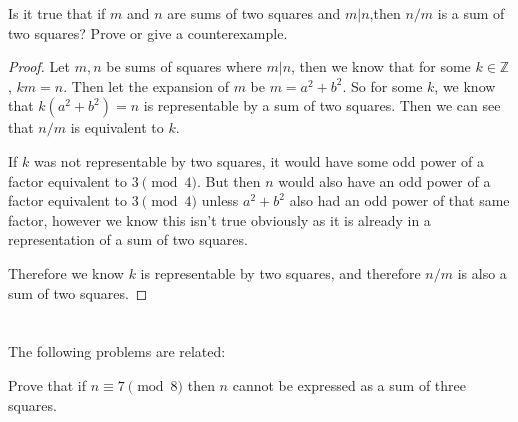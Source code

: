 \documentclass[11pt]{article}
\newcommand{\Z}{\mathbb{Z}}
\newenvironment{problem}[2][Problem]{\begin{trivlist}
\item[\hskip \labelsep {\bfseries #1}\hskip \labelsep {\bfseries #2.}]}{\end{trivlist}}
\begin{document}
\begin{problem}{7}
Is it true that if $m$ and $n$ are sums of two squares and $m|n$,then $n/m$ is a sum of two squares? Prove or give a counterexample.
\end{problem}

\begin{proof}
  Let $m,n$ be sums of squares where $m|n$, then we know that for some $k\in \Z$, $km=n$. Then let the expansion of $m$ be $m=a^2+b^2$. So for some $k$, we know that $k(a^2+b^2)=n$ is representable by a sum of two squares.
  Then we can see that $n/m$ is equivalent to $k$.

  If $k$ was not representable by two squares, it would have some odd power of a factor equivalent to $3 \pmod{4}$. But then $n$ would also have an odd power of a factor equivalent to $3\pmod{4}$ unless $a^2+b^2$ also had an odd power of that same factor, however we know this isn't true obviously as it is already in a representation of a sum of two squares.

  Therefore we know $k$ is representable by two squares, and therefore $n/m$ is also a sum of two squares.
\end{proof}


\section{} The following problems are related:

\begin{problem}{(a)}
Prove that if $n\equiv 7\pmod{8}$ then $n$ cannot be expressed as a sum of three squares.
\end{problem}
\end{document}
